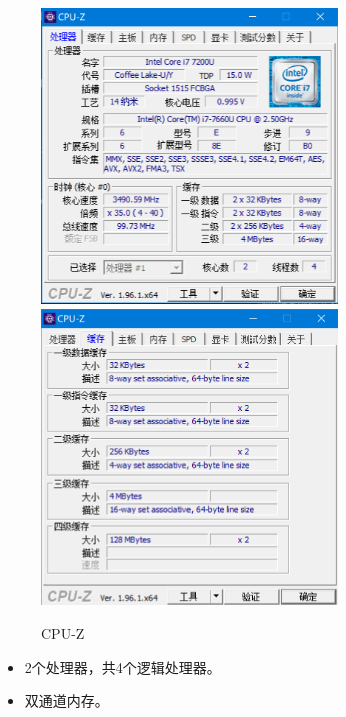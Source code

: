 \documentclass[12pt,a4paper]{article}
\newenvironment{problems}{\begin{list}{}{\renewcommand{\makelabel}[1]{\textbf{##1}.\hfil}}}{\end{list}}
\begin{document}
\begin{problems}
\begin{itemize}
\begin{figure}[h]
            \includegraphics[width=0.7\textwidth]{cpu.png}\\
            \includegraphics[width=0.7\textwidth]{cpuz.png}
            \caption{CPU-Z}
            \label{fig:cpuz}
        \end{figure}
    \end{itemize}

    \begin{itemize}
        \item 2个处理器，共4个逻辑处理器。
        \item 双通道内存。
    \end{itemize}

\end{problems}
\end{document}
